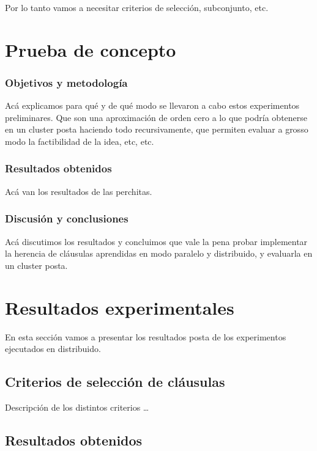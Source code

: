 Por lo tanto vamos a necesitar criterios de selección, subconjunto, etc.


\section{Prueba de concepto}

\subsubsection{Objetivos y metodología}

Acá explicamos para qué y de qué modo se llevaron a cabo estos experimentos
preliminares. Que son una aproximación de orden cero a lo que podría obtenerse
en un cluster posta haciendo todo recursivamente, que permiten evaluar a
grosso modo la factibilidad de la idea, etc, etc.

\subsubsection{Resultados obtenidos}

Acá van los resultados de las perchitas.

\subsubsection{Discusión y conclusiones}

Acá discutimos los resultados y concluimos que vale la pena probar implementar
la herencia de cláusulas aprendidas en modo paralelo y distribuido, y
evaluarla en un cluster posta.


\section{Resultados experimentales}

En esta sección vamos a presentar los resultados posta de los experimentos
ejecutados en distribuido.

\subsection{Criterios de selección de cláusulas}

Descripción de los distintos criterios \ldots

\subsection{Resultados obtenidos}

